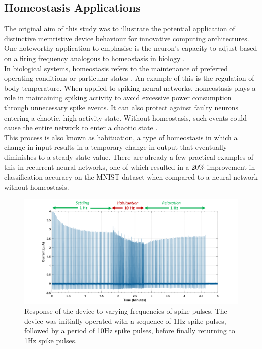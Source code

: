 \subsection[Homeostasis Applications]{Homeostasis Applications}

\noindent The original aim of this study was to illustrate the potential application of distinctive memristive device behaviour for innovative computing architectures. One noteworthy application to emphasise is the neuron's capacity to adjust based on a firing frequency analogous to homeostasis in biology \cite{tien2018homeostatic}. \\

\noindent In biological systems, homeostasis refers to the maintenance of preferred operating conditions or particular states \cite{turrigiano1999homeostatic}. An example of this is the regulation of body temperature. When applied to spiking neural networks, homeostasis plays a role in maintaining spiking activity to avoid excessive power consumption through unnecessary spike events. It can also protect against faulty neurons entering a chaotic, high-activity state. Without homeostasis, such events could cause the entire network to enter a chaotic state \cite{marder2006variability}. \\

\noindent This process is also known as habituation, a type of homeostasis in which a change in input results in a temporary change in output that eventually diminishes to a steady-state value. There are already a few practical examples of this in recurrent neural networks, one of which resulted in a 20\% improvement in classification accuracy on the MNIST dataset when compared to a neural network without homeostasis.\\

\begin{figure}[htbp!] 
\centering    
\includegraphics[width=1\textwidth]{Chapter3/Figs/3l.png}
\caption[Response of the device to different frequency of spike pulses]{Response of the device to varying frequencies of spike pulses. The device was initially operated with a sequence of 1Hz spike pulses, followed by a period of 10Hz spike pulses, before finally returning to 1Hz spike pulses.}
\label{fig:3l}
\end{figure}

